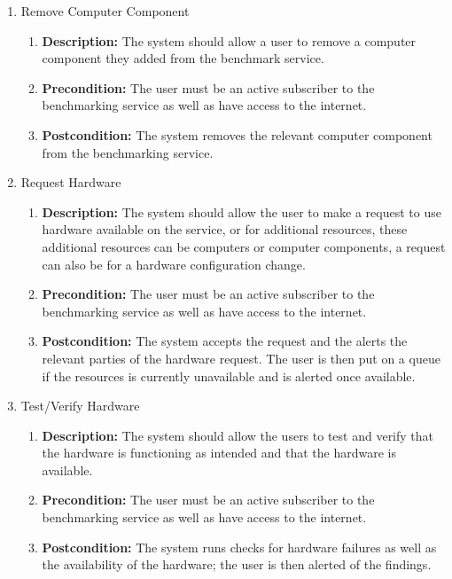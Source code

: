 \documentclass{article}
\begin{document}
\begin{enumerate}
\begin{enumerate}
        \item Remove Computer Component
		\begin{enumerate}
			\item \textbf{Description:} The system should allow a user to remove a computer component they added from the benchmark service.
			\item \textbf{Precondition:} The user must be an active subscriber to the benchmarking service as well as have access to the internet.
			\item \textbf{Postcondition:} The system removes the relevant computer component from the benchmarking service.\newline
		\end{enumerate}
        
        \item Request Hardware
		\begin{enumerate}
			\item \textbf{Description:} The system should allow the user to make a request to use hardware available on the service, or for additional resources, these additional resources can be computers or computer components, a request can also be for a hardware configuration change.
			\item \textbf{Precondition:} The user must be an active subscriber to the benchmarking service as well as have access to the internet.
			\item \textbf{Postcondition:} The system accepts the request and the alerts the relevant parties of the hardware request. The user is then put on a queue if the resources is currently unavailable and is alerted once available. \newline
		\end{enumerate}
        
        \item Test/Verify Hardware
		\begin{enumerate}
			\item \textbf{Description:} The system should allow the users to test and verify that the hardware is functioning as intended and that the hardware is available.
			\item \textbf{Precondition:} The user must be an active subscriber to the benchmarking service as well as have access to the internet.
			\item \textbf{Postcondition:} The system runs checks for hardware failures as well as the availability of the hardware; the user is then alerted of the findings.\newline
		\end{enumerate}
        \end{enumerate}
        

\end{enumerate}
\end{document}
